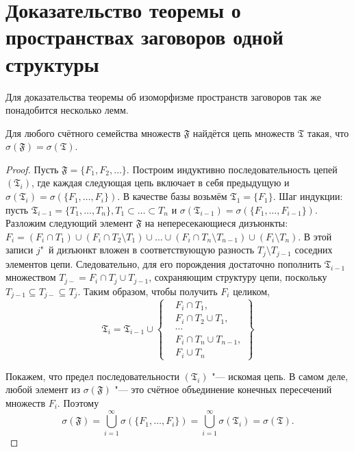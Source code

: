 \chapter{Доказательство теоремы о пространствах заговоров одной структуры}\label{app:C}

Для доказательства теоремы об изоморфизме пространств заговоров так же понадобится несколько лемм.

\begin{lemma}\label{lemma:card}
	Для любого счётного семейства множеств $\mathfrak{F}$ найдётся цепь множеств $\mathfrak{T}$ такая, что $\sigma(\mathfrak{F}) = \sigma(\mathfrak{T})$.
\end{lemma}

\begin{proof}
	Пусть $\mathfrak{F} = \{F_1, F_2, \ldots\}$. Построим индуктивно последовательность цепей $(\mathfrak{T}_i)$, где каждая следующая цепь включает в себя предыдущую и $\sigma(\mathfrak{T}_i) = \sigma(\{F_1, \ldots, F_i\})$. В качестве базы возьмём $\mathfrak{T}_1 = \{F_1\}$. Шаг индукции: пусть $\mathfrak{T}_{i-1} = \{T_1, \ldots, T_n\}, T_1 \subset \ldots \subset T_n$ и $\sigma(\mathfrak{T}_{i-1}) = \sigma(\{F_1, \ldots, F_{i-1}\})$. Разложим следующий элемент $\mathfrak{F}$ на непересекающиеся дизъюнкты: $F_i = (F_i \cap T_1) \cup (F_i \cap T_2 \setminus T_1) \cup \ldots \cup (F_i \cap T_n \setminus T_{n-1}) \cup (F_i \setminus T_n)$. В этой записи $j$"~й дизъюнкт вложен в соответствующую разность $T_j \setminus T_{j-1}$ соседних элементов цепи. Следовательно, для его порождения достаточно пополнить $\mathfrak{T}_{i-1}$ множеством $T_{j-} = F_i \cap T_j \cup T_{j-1}$, сохраняющим структуру цепи, поскольку $T_{j-1} \subseteq T_{j-} \subseteq T_j$. Таким образом, чтобы получить $F_i$ целиком,
	\begin{equation*}
		\mathfrak{T}_i = \mathfrak{T}_{i-1} \cup \left\{
		\begin{aligned}
			&F_i \cap T_1,\\
			&F_i \cap T_2 \cup T_1,\\
			&\cdots\\
			&F_i \cap T_n \cup T_{n-1},\\
			&F_i \cup T_n
		\end{aligned}
		\right\}
	\end{equation*}
	
	Покажем, что предел последовательности $(\mathfrak{T}_i)$ "--- искомая цепь. В самом деле, любой элемент из $\sigma(\mathfrak{F})$ "--- это счётное объединение конечных пересечений множеств $F_i$. Поэтому
	\begin{equation*}
		\sigma(\mathfrak{F}) = \bigcup_{i=1}^{\infty} \sigma(\{F_1, \ldots, F_i\}) = \bigcup_{i=1}^{\infty} \sigma(\mathfrak{T}_i) = \sigma(\mathfrak{T}).
	\end{equation*}
\end{proof}

